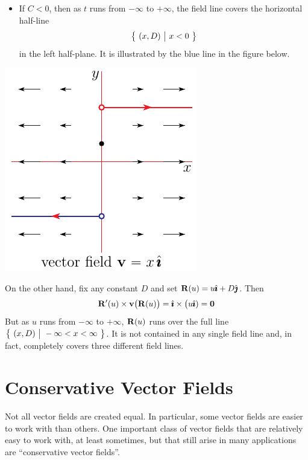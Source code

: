 \begin{eg}
\begin{itemize}
\item
If $C<0$, then as $t$ runs from $-\infty$ to $+\infty$, the field line
covers the horizontal half-line
\begin{equation*}
\big\{ \ (x,D)\ \big|\ x<0\ \big\}
\end{equation*}
in the left half-plane.
It is illustrated by the blue line in the figure below.


\end{itemize}

\begin{nfig}
\begin{center}
   \includegraphics{horizontalField}
\end{center}
\end{nfig}
On the other hand, fix any constant $D$ and set $\mathbf{R}(u) = u\hat{\pmb{\imath}} +D\hat{\pmb{\jmath}}$.
Then
\begin{equation*}
\mathbf{R}'(u)\times\mathbf{v}\big(\mathbf{R}(u)\big)
=\hat{\pmb{\imath}}\times\big(u\hat{\pmb{\imath}})
=\mathbf{0}
\end{equation*}
But as $u$ runs from $-\infty$ to $+\infty$, $\mathbf{R}(u)$ runs over the 
full line $\big\{ \ (x,D)\ \big|\ -\infty<x<\infty\ \big\}$. It is not contained in any
single field line and, in fact, completely covers three
different field lines. 


\end{eg}

\section{Conservative Vector Fields}\label{sec:conservativeFields}

Not all vector fields are created equal. In particular, some vector
fields are easier to work with than others. One important class 
of vector fields that are relatively easy to work with, at least sometimes, 
but that still arise in many applications are ``conservative vector fields''. 

